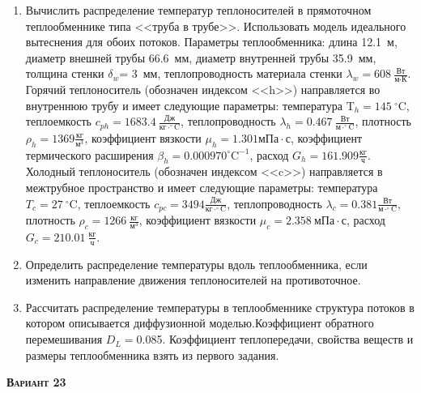 \begin{enumerate} 
\item Вычислить распределение температур теплоносителей в прямоточном теплообменнике типа <<труба в трубе>>. Использовать модель идеального вытеснения для обоих потоков. Параметры теплообменника: длина  12.1~м, диаметр внешней трубы 66.6~мм,  диаметр внутренней трубы 35.9~мм, толщина стенки $\delta_{w}$=     3~мм,  теплопроводность материала стенки $\lambda_{w}=  608~\frac{\text{Вт}}{\text{м} \cdot \text{К}}$.  Горячий теплоноситель (обозначен индексом <<h>>) направляется во внутреннюю трубу и	 имеет следующие параметры: температура $\text{T}_{h}= 145~^\circ\mathrm{C}$, теплоемкость	  $c_{p{h}}= 1683.4~\frac{\text{Дж}}{\text{кг} \cdot ^\circ\mathrm{C}}$, теплопроводность 		$\lambda_{h}= 0.467~\frac{\text{Вт}}{\text{м} \cdot ^\circ\mathrm{C}}$, плотность 		$\rho_{h}= 1369 \frac{\text{кг}}{\text{м}^3}$, коэффициент вязкости $\mu_{h}=1.301 \text{мПа} 		\cdot \text{с} $, коэффициент термического расширения $\beta_{h}=0.000970 ^\circ\mathrm{C}^{-1}$,		 расход $G_{h}= 161.909 \frac{\text{кг}}{\text{ч}}$. Холодный теплоноситель (обозначен индексом <<c>>) 		 направляется в межтрубное пространство и имеет следующие параметры: температура $T_{c}=   27		 ~^\circ\mathrm{C}$, теплоемкость $c_{p{c}}= 3494 \frac{\text{Дж}}{\text{кг} \cdot ^\circ\mathrm{C}}$,			 теплопроводность $\lambda_{c}=0.381 \frac{\text{Вт}}{\text{м} \cdot ^\circ\mathrm{C}}$, плотность 			 $\rho_{c}=  1266~\frac{\text{кг}}{\text{м}^3}$, коэффициент вязкости $\mu_{c}=2.358~\text{мПа} \cdot \text{с} $, 			 расход $G_{c}=210.01~\frac{\text{кг}}{\text{ч}}$. 

\item Определить распределение температуры вдоль теплообменника, если 	изменить направление движения теплоносителей на противоточное.

\item Рассчитать распределение температуры в теплообменнике структура потоков в котором описывается диффузионной моделью.Коэффициент обратного перемешивания $D_L = $0.085. Коэффициент теплопередачи, свойства веществ и размеры теплообменника взять из первого задания. 

\end{enumerate}

\textsc{\textbf{Вариант 23}}

